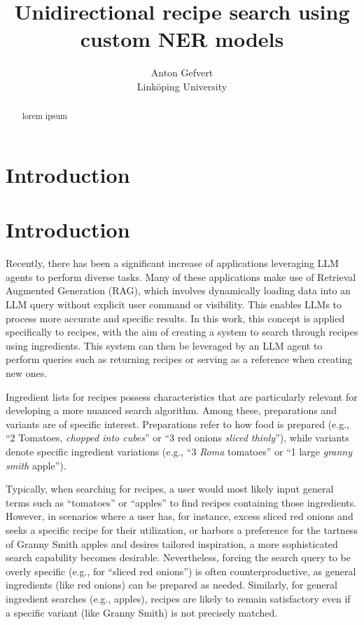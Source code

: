 \documentclass[11pt]{article}
\title{Unidirectional recipe search using custom NER models}
\date{}
\author{Anton Gefvert \\ Linköping University}
\begin{document}
\maketitle
\begin{abstract}
    lorem ipsum
\end{abstract}

\section{Introduction}
\section{Introduction}
Recently, there has been a significant increase of applications leveraging LLM
agents to perform diverse tasks.
Many of these applications make use of Retrieval Augmented Generation (RAG),
which involves dynamically loading data into an LLM query without explicit user
command or visibility.
This enables LLMs to process more accurate and specific results.
In this work, this concept is applied specifically to recipes, with the aim of
creating a system to search through recipes using ingredients.
This system can then be leveraged by an LLM agent to perform queries such as
returning recipes or serving as a reference when creating new ones.

Ingredient lists for recipes possess characteristics that are particularly
relevant for developing a more nuanced search algorithm.
Among these, preparations and variants are of specific interest.
Preparations refer to how food is prepared (e.g., ``2 Tomatoes, \emph{chopped
into cubes}'' or ``3 red onions \emph{sliced thinly}''), while variants denote
specific ingredient variations (e.g., ``3 \emph{Roma} tomatoes'' or ``1 large
\emph{granny smith} apple'').

Typically, when searching for recipes, a user would most likely input general
terms such as ``tomatoes'' or ``apples'' to find recipes containing those
ingredients.
However, in scenarios where a user has, for instance, excess sliced red onions
and seeks a specific recipe for their utilization, or harbors a preference for
the tartness of Granny Smith apples and desires tailored inspiration, a more
sophisticated search capability becomes desirable.
Nevertheless, forcing the search query to be overly specific (e.g., for ``sliced
red onions'') is often counterproductive, as general ingredients (like red
onions) can be prepared as needed.
Similarly, for general ingredient searches (e.g., apples), recipes are likely to
remain satisfactory even if a specific variant (like Granny Smith) is not
precisely matched.
\end{document}
